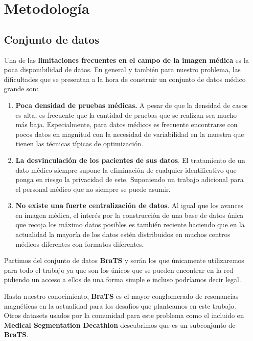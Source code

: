 \section{Metodología}

\subsection{Conjunto de datos}

Una de las \textbf{limitaciones frecuentes en el campo de la imagen médica} es la poca disponibilidad de datos. En general y también para nuestro problema, las dificultades que se presentan a la hora de construir un conjunto de datos médico grande son:

\begin{enumerate}
	\item \textbf{Poca densidad de pruebas médicas.} A pesar de que la densidad de casos es alta, es frecuente que la cantidad de pruebas que se realizan sea mucho más baja. Especialmente, para datos médicos es frecuente encontrarse con pocos datos en magnitud con la necesidad de variabilidad en la muestra que tienen las técnicas típicas de optimización.
	
	\item \textbf{La desvinculación de los pacientes de sus datos}. El tratamiento de un dato médico siempre supone la eliminación de cualquier identificativo que ponga en riesgo la privacidad de este. Suponiendo un trabajo adicional para el personal médico que no siempre se puede asumir.
	
	\item \textbf{No existe una fuerte centralización de datos}. Al igual que los avances en imagen médica, el interés por la construcción de una base de datos única que recoja los máximo datos posibles es también reciente haciendo que en la actualidad la mayoría de los datos estén distribuidos en muchos centros médicos diferentes con formatos diferentes.
	
\end{enumerate}

Partimos del conjunto de datos \textbf{BraTS} y serán los que únicamente utilizaremos para todo el trabajo ya que son los únicos que se pueden encontrar en la red pidiendo un acceso a ellos de una forma simple e incluso podríamos decir legal.

Hasta nuestro conocimiento, \textbf{BraTS} es el mayor conglomerado de resonancias magnéticas en la actualidad para los desafíos que planteamos en este trabajo. Otros datasets usados por la comunidad para este problema como el incluido en \textbf{Medical Segmentation Decathlon} descubrimos que es un subconjunto de \textbf{BraTS}.


